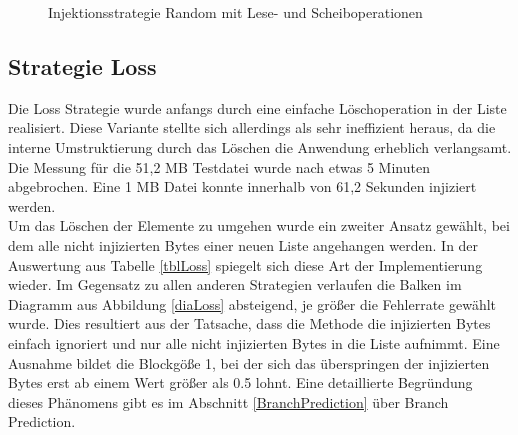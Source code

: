 \begin{figure}[!htb]

\caption[Messung Random Strategie]{Injektionsstrategie Random mit Lese- und Scheiboperationen}
\label{diaRandom}
\end{figure}


\subsection*{Strategie Loss}
Die Loss Strategie wurde anfangs durch eine einfache L\"oschoperation in der Liste realisiert. Diese Variante stellte sich allerdings als sehr ineffizient heraus, da die interne Umstruktierung durch das L\"oschen die Anwendung erheblich verlangsamt. Die Messung f\"ur die 51,2 MB Testdatei wurde nach etwas 5 Minuten abgebrochen. Eine 1 MB Datei konnte innerhalb von 61,2 Sekunden injiziert werden.  \\
Um das L\"oschen der Elemente zu umgehen wurde ein zweiter Ansatz gew\"ahlt, bei dem alle nicht injizierten Bytes einer neuen Liste angehangen werden. In der Auswertung aus Tabelle \ref{tblLoss} spiegelt sich diese Art der Implementierung wieder. Im Gegensatz zu allen anderen Strategien verlaufen die Balken im Diagramm aus Abbildung \ref{diaLoss} absteigend, je gr\"o\ss er die Fehlerrate gew\"ahlt wurde. Dies resultiert aus der Tatsache, dass die Methode die injizierten Bytes einfach ignoriert und nur alle nicht injizierten Bytes in die Liste aufnimmt. Eine Ausnahme bildet die Blockg\"o\ss e 1, bei der sich das \"uberspringen der injizierten Bytes erst ab einem Wert gr\"o\ss er als 0.5 lohnt. Eine detaillierte Begr\"undung dieses Ph\"anomens gibt es im Abschnitt \ref{BranchPrediction} \"uber Branch Prediction.\\

